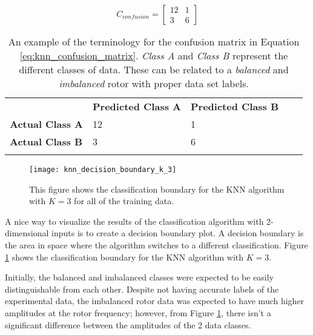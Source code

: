 \begin{equation} \label{eq:knn_confusion_matrix}
C_{confusion} = 
\begin{bmatrix}
	12 & 1 \\
	3 & 6
\end{bmatrix}
\end{equation}

\begin{table}[]
\centering
\caption{An example of the terminology for the confusion matrix in Equation \ref{eq:knn_confusion_matrix}. \textit{Class A} and \textit{Class B} represent the different classes of data.  These can be related to a \textit{balanced} and \textit{imbalanced} rotor with proper data set labels.}
\label{t:confusion_matrix_ex}
\vspace*{0.2in}
\begin{tabular}{lllll}
\cline{2-3}
\multicolumn{1}{l|}{}                      & \multicolumn{1}{l|}{\textbf{Predicted Class A}} & \multicolumn{1}{l|}{\textbf{Predicted Class B}} &  &  \\ \cline{1-3}
\multicolumn{1}{|l|}{\textbf{Actual Class A}}  & \multicolumn{1}{l|}{12}                     & \multicolumn{1}{l|}{1}                       &  &  \\ \cline{1-3}
\multicolumn{1}{|l|}{\textbf{Actual Class B}} & \multicolumn{1}{l|}{3}                      & \multicolumn{1}{l|}{6}                       &  &  \\ \cline{1-3}
                                           &                                             &                                              &  & 
\end{tabular}
\end{table}


\begin{figure}
	\centering
	\texttt{[image: knn\_decision\_boundary\_k\_3]}
	\decoRule
	\caption{This figure shows the classification boundary for the KNN algorithm with $K=3$ for all of the training data.}
	\label{fig:knn_decision_boundary_k_3}
\end{figure}

A nice way to visualize the results of the classification algorithm with 2-dimensional inputs is to create a decision boundary plot.  A decision boundary is the area in space where the algorithm switches to a different classification.  Figure \ref{fig:knn_decision_boundary_k_3} shows the classification boundary for the KNN algorithm with $K=3$.

Initially, the balanced and imbalanced classes were expected to be easily distinguishable from each other.  Despite not having accurate labels of the experimental data, the imbalanced rotor data was expected to have much higher amplitudes at the rotor frequency; however, from Figure \ref{fig:knn_decision_boundary_k_3}, there isn't a significant difference between the amplitudes of the 2 data classes.

